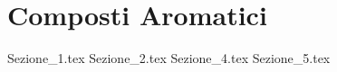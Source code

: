 \chapter{Composti Aromatici}\label{chp:aromatici}
{Sezione_1.tex} %
{Sezione_2.tex} %
{Sezione_4.tex} %
{Sezione_5.tex} %